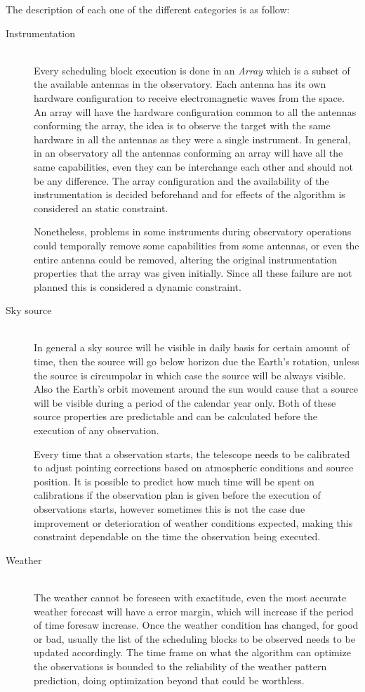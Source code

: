 The description of each one of the different categories is as follow:

\begin{description}
    \item[Instrumentation] \hfill \\
Every scheduling block execution is done in an \textit{Array} which is a subset of the available antennas in the observatory. Each antenna has its own hardware configuration to receive electromagnetic waves from the space. An array will have the hardware configuration common to all the antennas conforming the array, the idea is to observe the target with the same hardware in all the antennas as they were a single instrument. In general, in an observatory all the antennas conforming an array will have all the same capabilities, even they can be interchange each other and should not be any difference. The array configuration and the availability of the instrumentation is decided beforehand and for effects of the algorithm is considered an static constraint. 

Nonetheless, problems in some instruments during observatory operations could temporally remove some capabilities from some antennas, or even the entire antenna could be removed, altering the original instrumentation properties that the array was given initially. Since all these failure are not planned this is considered a dynamic constraint.

	\item[Sky source] \hfill \\
In general a sky source will be visible in daily basis for certain amount of time, then the source will go below horizon due the Earth's rotation, unless the source is circumpolar in which case the source will be always visible. Also the Earth's orbit movement around the sun would cause that a source will be visible during a period of the calendar year only. Both of these source properties are predictable and can be calculated before the execution of any observation.

Every time that a observation starts, the telescope needs to be calibrated to adjust pointing corrections based on atmospheric conditions and source position. It is possible to predict how much time will be spent on calibrations if the observation plan is given before the execution of observations starts, however sometimes this is not the case due improvement or deterioration of weather conditions expected, making this constraint dependable on the time the observation being executed.
  
	\item[Weather] \hfill \\
The weather cannot be foreseen with exactitude, even the most accurate weather forecast will have a error margin, which will increase if the period of time foresaw increase. Once the weather condition has changed, for good or bad, usually the list of the scheduling blocks to be observed needs to be updated accordingly. The time frame on what the algorithm can optimize the observations is bounded to the reliability of the weather pattern prediction, doing optimization beyond that could be worthless.

\end{description}

